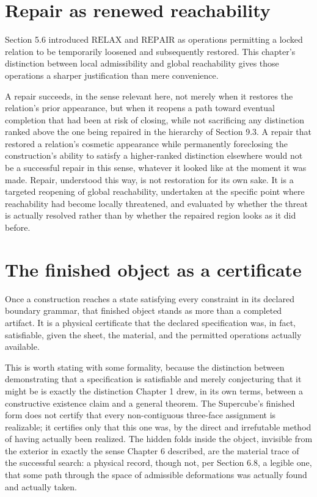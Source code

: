\documentclass[11pt,oneside]{book}
\begin{document}
\hypertarget{repair-as-renewed-reachability}{%
\section{Repair as renewed
reachability}\label{repair-as-renewed-reachability}}

Section 5.6 introduced \(\text{RELAX}\) and \(\text{REPAIR}\) as
operations permitting a locked relation to be temporarily loosened and
subsequently restored. This chapter's distinction between local
admissibility and global reachability gives those operations a sharper
justification than mere convenience.

A repair succeeds, in the sense relevant here, not merely when it
restores the relation's prior appearance, but when it reopens a path
toward eventual completion that had been at risk of closing, while not
sacrificing any distinction ranked above the one being repaired in the
hierarchy of Section 9.3. A repair that restored a relation's cosmetic
appearance while permanently foreclosing the construction's ability to
satisfy a higher-ranked distinction elsewhere would not be a successful
repair in this sense, whatever it looked like at the moment it was made.
Repair, understood this way, is not restoration for its own sake. It is
a targeted reopening of global reachability, undertaken at the specific
point where reachability had become locally threatened, and evaluated by
whether the threat is actually resolved rather than by whether the
repaired region looks as it did before.

\hypertarget{the-finished-object-as-a-certificate}{%
\section{The finished object as a
certificate}\label{the-finished-object-as-a-certificate}}

Once a construction reaches a state satisfying every constraint in its
declared boundary grammar, that finished object stands as more than a
completed artifact. It is a physical certificate that the declared
specification was, in fact, satisfiable, given the sheet, the material,
and the permitted operations actually available.

This is worth stating with some formality, because the distinction
between demonstrating that a specification is satisfiable and merely
conjecturing that it might be is exactly the distinction Chapter 1 drew,
in its own terms, between a constructive existence claim and a general
theorem. The Supercube's finished form does not certify that every
non-contiguous three-face assignment is realizable; it certifies only
that this one was, by the direct and irrefutable method of having
actually been realized. The hidden folds inside the object, invisible
from the exterior in exactly the sense Chapter 6 described, are the
material trace of the successful search: a physical record, though not,
per Section 6.8, a legible one, that some path through the space of
admissible deformations was actually found and actually taken.
\end{document}
